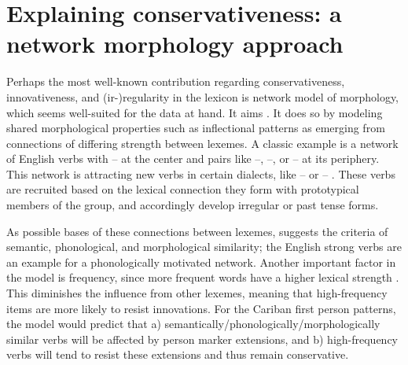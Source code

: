 \section{Explaining conservativeness: a network morphology approach}
\label{sec:motivations}
Perhaps the most well-known contribution regarding conservativeness, innovativeness, and (ir-){}re\-gu\-la\-ri\-ty in the lexicon is  network model of morphology, which seems well-suited for the data at hand.
It aims  \parencite[428]{bybee1995regular}.
It does so by modeling shared morphological properties such as inflectional patterns as emerging from connections of differing strength between lexemes.
A classic example is a network of  English verbs with -- at the center and pairs like --, --, or -- at its periphery.
This network is attracting new verbs in certain dialects, like -- or -- \parencite[129--130]{bybee1985morphology}.
These verbs are recruited based on the lexical connection they form with prototypical members of the group, and accordingly develop irregular or  past tense forms.

As possible bases of these connections between lexemes, \textcite[118]{bybee1985morphology} suggests the criteria of semantic, phonological, and morphological similarity; the English strong verbs are an example for a phonologically motivated network.
Another important factor in the model is frequency, since more frequent words have a higher lexical strength \parencite[119]{bybee1985morphology}.
This diminishes the influence from other lexemes, meaning that high-frequency items are more likely to resist innovations.
For the Cariban first person patterns, the model would predict that a) semantically\slash{}phonologically\slash\hspace{0pt}morphologically similar verbs will be affected by person marker extensions, and b) high-frequency verbs will tend to resist these extensions and thus remain conservative.

